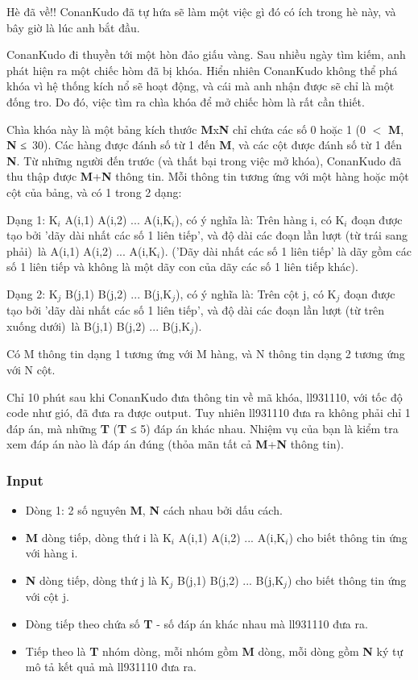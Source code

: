 

Hè đã về!! ConanKudo đã tự hứa sẽ làm một việc gì đó có ích trong hè này, và bây giờ là lúc anh bắt đầu.

ConanKudo đi thuyền tới một hòn đảo giấu vàng. Sau nhiều ngày tìm kiếm, anh phát hiện ra một chiếc hòm đã bị khóa. Hiển nhiên ConanKudo không thể phá khóa vì hệ thống kích nổ sẽ hoạt động, và cái mà anh nhận được sẽ chỉ là một đống tro. Do đó, việc tìm ra chìa khóa để mở chiếc hòm là rất cần thiết.

Chìa khóa này là một bảng kích thước \textbf{M}x\textbf{N} chỉ chứa các số 0 hoặc 1 (0 $<$ \textbf{M}, \textbf{N} ≤ 30). Các hàng được đánh số từ 1 đến \textbf{M}, và các cột được đánh số từ 1 đến \textbf{N}. Từ những người đến trước (và thất bại trong việc mở khóa), ConanKudo đã thu thập được \textbf{M}+\textbf{N} thông tin. Mỗi thông tin tương ứng với một hàng hoặc một cột của bảng, và có 1 trong 2 dạng:

Dạng 1: K$_i$ A(i,1) A(i,2) ... A(i,K$_i$), có ý nghĩa là: Trên hàng i, có K$_i$ đoạn được tạo bởi 'dãy dài nhất các số 1 liên tiếp', và độ dài các đoạn lần lượt (từ trái sang phải) là A(i,1) A(i,2) ... A(i,K$_i$). ('Dãy dài nhất các số 1 liên tiếp' là dãy gồm các số 1 liên tiếp và không là một dãy con của dãy các số 1 liên tiếp khác).

Dạng 2: K$_j$ B(j,1) B(j,2) ... B(j,K$_j$), có ý nghĩa là: Trên cột j, có K$_j$ đoạn được tạo bởi 'dãy dài nhất các số 1 liên tiếp', và độ dài các đoạn lần lượt (từ trên xuống dưới) là B(j,1) B(j,2) ... B(j,K$_j$).

Có M thông tin dạng 1 tương ứng với M hàng, và N thông tin dạng 2 tương ứng với N cột.

Chỉ 10 phút sau khi ConanKudo đưa thông tin về mã khóa, ll931110, với tốc độ code như gió, đã đưa ra được output. Tuy nhiên ll931110 đưa ra không phải chỉ 1 đáp án, mà những \textbf{T} (\textbf{T} ≤ 5) đáp án khác nhau. Nhiệm vụ của bạn là kiểm tra xem đáp án nào là đáp án đúng (thỏa mãn tất cả \textbf{M}+\textbf{N} thông tin).

\subsubsection{Input}
\begin{itemize}
	\item Dòng 1: 2 số nguyên \textbf{M}, \textbf{N} cách nhau bởi dấu cách.
	\item \textbf{M} dòng tiếp, dòng thứ i là K$_i$ A(i,1) A(i,2) ... A(i,K$_i$) cho biết thông tin ứng với hàng i.
	\item \textbf{N} dòng tiếp, dòng thứ j là K$_j$ B(j,1) B(j,2) ... B(j,K$_j$) cho biết thông tin ứng với cột j.
	\item Dòng tiếp theo chứa số \textbf{T} - số đáp án khác nhau mà ll931110 đưa ra.
	\item Tiếp theo là \textbf{T} nhóm dòng, mỗi nhóm gồm \textbf{M} dòng, mỗi dòng gồm \textbf{N} ký tự mô tả kết quả mà ll931110 đưa ra.
\end{itemize}

